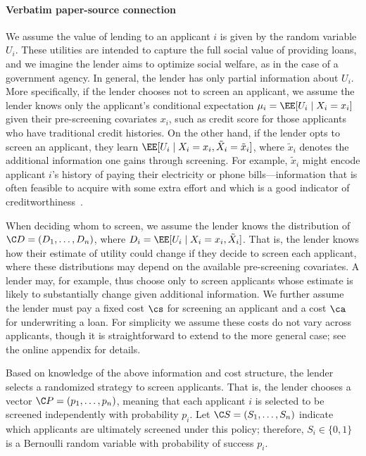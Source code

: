 \documentclass[10pt]{article}
\begin{document}
\paragraph{Verbatim paper-source connection}
\begin{ReviewVerbatim}
We assume the value of lending to an applicant \(i\) is given by the random variable \(U_i\).
These utilities are intended to capture the full social value of providing loans, and we imagine the lender aims to optimize social welfare, as in the case of a government agency.
In general, the lender has only partial information about \(U_i\). More specifically, if the lender chooses not to screen an applicant, we assume the lender knows only the applicant's conditional expectation \(\mu_i = \EE [U_i \mid X_i = x_i]\)
given their pre-screening covariates \(x_i\), such as credit score for those applicants who have traditional credit histories.
On the other hand, if the lender opts to screen an applicant, they learn \(\EE[U_i \mid X_i = x_i, \tilde{X}_i = \tilde{x}_i]\), where \(\tilde{x}_i\) denotes the additional information one gains through screening.
For example, \(\tilde{x}_i\) might encode applicant \(i\)'s history of paying
their electricity or phone bills---information that is often feasible to acquire with some extra effort and which is a good indicator of creditworthiness~\cite{fdic2018}.

When deciding whom to screen, we assume
the lender knows the distribution of \(\C D = (D_1, \ldots, D_n)\), where \(D_i = \EE[U_i \mid X_i = x_i, \tilde{X}_i]\).
That is, the lender knows how their estimate of utility could change if they decide to screen each applicant, where these distributions may depend on the available pre-screening covariates.
A lender may, for example, thus choose only to screen applicants whose estimate is likely to substantially change given additional information.
We further assume the lender must pay a
fixed cost \(\cs\) for screening an applicant
and a cost \(\ca\) for underwriting a loan.
For simplicity we assume these costs do not vary across applicants, though it is straightforward to extend to the more general case; see the online appendix for details.

Based on knowledge of the above information and cost structure, the lender selects a randomized strategy to screen applicants.
That is, the lender chooses a vector
\(\C P = (p_1, \dots, p_n)\), meaning that each applicant \(i\) is selected to be screened independently with probability \(p_i\).
Let \(\C S = (S_1, \dots, S_n)\) indicate which applicants are ultimately screened under this policy; therefore, \(S_i \in \{0,1\}\) is a Bernoulli random variable with probability of success \(p_i\).


\end{ReviewVerbatim}
\end{document}
